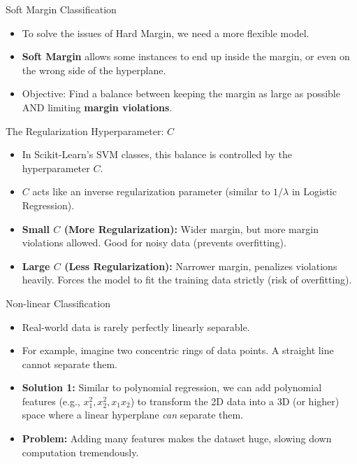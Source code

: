 \documentclass[aspectratio=169]{beamer}
\begin{document}
\begin{frame}{Soft Margin Classification}
\begin{itemize}
    \item To solve the issues of Hard Margin, we need a more flexible model.
    \item \textbf{Soft Margin} allows some instances to end up inside the margin, or even on the wrong side of the hyperplane.
    \item Objective: Find a balance between keeping the margin as large as possible AND limiting \textbf{margin violations}.
\end{itemize}
\end{frame}

\begin{frame}{The Regularization Hyperparameter: $C$}
\begin{itemize}
    \item In Scikit-Learn's SVM classes, this balance is controlled by the hyperparameter $C$.
    \item $C$ acts like an inverse regularization parameter (similar to $1/\lambda$ in Logistic Regression).
    \item \textbf{Small $C$ (More Regularization):} Wider margin, but more margin violations allowed. Good for noisy data (prevents overfitting).
    \item \textbf{Large $C$ (Less Regularization):} Narrower margin, penalizes violations heavily. Forces the model to fit the training data strictly (risk of overfitting).
\end{itemize}
\end{frame}

\begin{frame}{Non-linear Classification}
\begin{itemize}
    \item Real-world data is rarely perfectly linearly separable.
    \item For example, imagine two concentric rings of data points. A straight line cannot separate them.
    \item \textbf{Solution 1:} Similar to polynomial regression, we can add polynomial features (e.g., $x_1^2, x_2^2, x_1x_2$) to transform the 2D data into a 3D (or higher) space where a linear hyperplane \textit{can} separate them.
    \item \textbf{Problem:} Adding many features makes the dataset huge, slowing down computation tremendously.
\end{itemize}
\end{frame}
\end{document}
